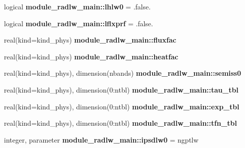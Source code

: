 \begin{DoxyCompactItemize}
\item 
\mbox{\label{group__module__radlw__main_ga7f8818436b81efe586d83b2f03b1617f}} 
logical {\bfseries module\+\_\+radlw\+\_\+main\+::lhlw0} = .false.
\item 
\mbox{\label{group__module__radlw__main_gaec461dc1a50b326daa15c57c7dc55602}} 
logical {\bfseries module\+\_\+radlw\+\_\+main\+::lflxprf} = .false.
\item 
\mbox{\label{group__module__radlw__main_ga3c31da677e01139d9a3f1e0795a0b614}} 
real(kind=kind\+\_\+phys) {\bfseries module\+\_\+radlw\+\_\+main\+::fluxfac}
\item 
\mbox{\label{group__module__radlw__main_ga75ff8e29e21f0d07684d4a09c744daec}} 
real(kind=kind\+\_\+phys) {\bfseries module\+\_\+radlw\+\_\+main\+::heatfac}
\item 
\mbox{\label{group__module__radlw__main_gae3b32aa685e5f07a0003c5e919d22996}} 
real(kind=kind\+\_\+phys), dimension(nbands) {\bfseries module\+\_\+radlw\+\_\+main\+::semiss0}
\item 
\mbox{\label{group__module__radlw__main_ga9f73814ee0b1840d8c546ef341645f43}} 
real(kind=kind\+\_\+phys), dimension(0\+:ntbl) {\bfseries module\+\_\+radlw\+\_\+main\+::tau\+\_\+tbl}
\item 
\mbox{\label{group__module__radlw__main_gac2f240a927351a68fc9063321a307891}} 
real(kind=kind\+\_\+phys), dimension(0\+:ntbl) {\bfseries module\+\_\+radlw\+\_\+main\+::exp\+\_\+tbl}
\item 
\mbox{\label{group__module__radlw__main_ga71dcfb3c365280e100e180fd1ce939ad}} 
real(kind=kind\+\_\+phys), dimension(0\+:ntbl) {\bfseries module\+\_\+radlw\+\_\+main\+::tfn\+\_\+tbl}
\item 
\mbox{\label{group__module__radlw__main_ga9b634a4f7b06ffdd919de69a165edadc}} 
integer, parameter {\bfseries module\+\_\+radlw\+\_\+main\+::ipsdlw0} = ngptlw
\end{DoxyCompactItemize}
